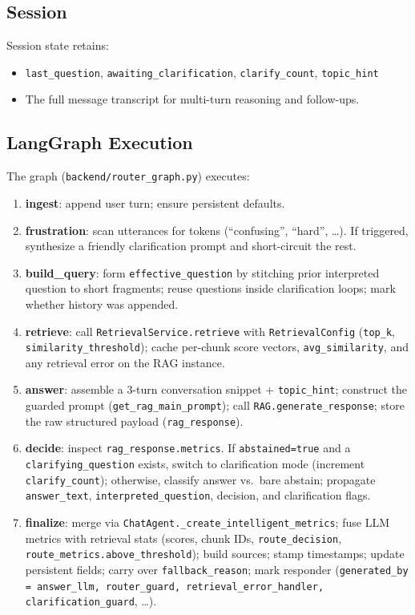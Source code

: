 \documentclass[11pt]{article}
\begin{document}
\subsection{Session }
Session state retains:
\begin{itemize}[leftmargin=1.25em]
  \item \texttt{last\_question}, \texttt{awaiting\_clarification}, \texttt{clarify\_count}, \texttt{topic\_hint}
  \item The full message transcript for multi-turn reasoning and follow-ups.
\end{itemize}

\subsection{LangGraph Execution}
The graph (\texttt{backend/router\_graph.py}) executes:
\begin{enumerate}[leftmargin=1.25em]
  \item \textbf{ingest}: append user turn; ensure persistent defaults.
  \item \textbf{frustration}: scan utterances for tokens (``confusing'', ``hard'', \dots). If triggered, synthesize a friendly clarification prompt and short-circuit the rest.
  \item \textbf{build\_query}: form \texttt{effective\_question} by stitching prior interpreted question to short fragments; reuse questions inside clarification loops; mark whether history was appended.
  \item \textbf{retrieve}: call \texttt{RetrievalService.retrieve} with \texttt{RetrievalConfig} (\texttt{top\_k}, \texttt{similarity\_threshold}); cache per-chunk score vectors, \texttt{avg\_similarity}, and any retrieval error on the RAG instance.
  \item \textbf{answer}: assemble a 3-turn conversation snippet + \texttt{topic\_hint}; construct the guarded prompt (\texttt{get\_rag\_main\_prompt}); call \texttt{RAG.generate\_response}; store the raw structured payload (\texttt{rag\_response}).
  \item \textbf{decide}: inspect \texttt{rag\_response.metrics}. If \texttt{abstained=true} and a \texttt{clarifying\_question} exists, switch to clarification mode (increment \texttt{clarify\_count}); otherwise, classify answer vs.\ bare abstain; propagate \texttt{answer\_text}, \texttt{interpreted\_question}, decision, and clarification flags.
  \item \textbf{finalize}: merge via \texttt{ChatAgent.\_create\_intelligent\_metrics}; fuse LLM metrics with retrieval stats (scores, chunk IDs, \texttt{route\_decision}, \texttt{route\_metrics.above\_threshold}); build sources; stamp timestamps; update persistent fields; carry over \texttt{fallback\_reason}; mark responder (\texttt{generated\_by = answer\_llm, router\_guard, retrieval\_error\_handler, clarification\_guard}, \dots).
\end{enumerate}
\end{document}

